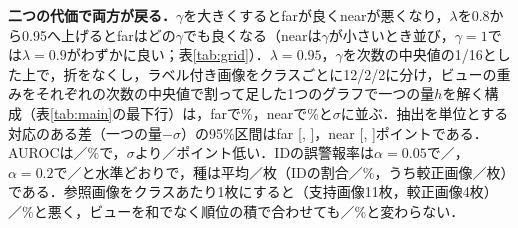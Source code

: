 \documentclass[a4paper,10pt,dvipdfmx]{jsarticle}
\theoremstyle{definition}
\newcommand{\AUC}{AUROC}
\newcommand{\tabref}[1]{表\ref{#1}}
\begin{document}
\textbf{二つの代価で両方が戻る．}$\gamma$を大きくするとfarが良くnearが悪くなり，$\lambda$を0.8から0.95へ上げるとfarはどの$\gamma$でも良くなる（nearは$\gamma$が小さいとき並び，$\gamma{=}1$では$\lambda{=}0.9$がわずかに良い；\tabref{tab:grid}）．$\lambda{=}0.95$，$\gamma$を次数の中央値の1/16とした上で，折をなくし，ラベル付き画像をクラスごとに12/2/2に分け，ビューの重みをそれぞれの次数の中央値で割って足した1つのグラフで一つの量$h$を解く構成（\tabref{tab:main}の最下行）は，farで\NFinFar\%，nearで\NFinNear\%と$\sigma$に並ぶ．抽出を単位とする対応のある差（一つの量$-\sigma$）の95\%区間はfar [\NFinDiffFarLo, \NFinDiffFarHi]，near [\NFinDiffNearLo, \NFinDiffNearHi]ポイントである．\AUC{}は\NFinFarAuc{}／\NFinNearAuc\%で，$\sigma$より\NFinAucGapFar{}／\NFinAucGapNear{}ポイント低い．IDの誤警報率は$\alpha{=}0.05$で\NFinFarVal{}／\NFinNearVal{}，$\alpha{=}0.2$で\NFinFarValTwo{}／\NFinNearValTwo{}と水準どおりで，種は平均\NFinFarSeeds{}／\NFinNearSeeds{}枚（IDの割合\NFinFarIdf{}／\NFinNearIdf\%，うち較正画像\NFinFarCalSeeds{}／\NFinNearCalSeeds{}枚）である．参照画像をクラスあたり1枚にすると（支持画像11枚，較正画像4枚）\NPoolOneFar{}／\NPoolOneNear\%と悪く，ビューを和でなく順位の積で合わせても\NPoolPFar{}／\NPoolPNear\%と変わらない．
\end{document}
